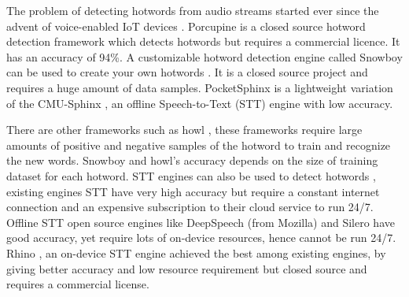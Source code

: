 \documentclass[10pt,twocolumn]{article}
\begin{document}
\label{Sec:Related_Works}
The problem of detecting hotwords from audio streams started ever since the advent of voice-enabled IoT devices \cite{Ooi_2019,Michaely_2017, inproceedings2_Reis_2018,inproceedings3_Todisco_2019,Tom_2018,He_Kaiming_2016,He_2016,Lin_2018,becker2019interpreting,Uitdenbogerd_2004,Tang_2018}. Porcupine \cite{picovoice_alireza} is a closed source hotword detection framework which detects hotwords but requires a commercial licence. It has an accuracy of 94\%. A customizable hotword detection engine called Snowboy can be used to create your own hotwords \cite{Yang_Jee_Leblanc_Weaver_Armand_2020}. It is a closed source project and requires a huge amount of data samples. PocketSphinx \cite{kalith_2012} is a lightweight variation of the CMU-Sphinx \cite{kalith_2012}, an offline Speech-to-Text (STT) engine with low accuracy. 

There are other frameworks such as howl \cite{tang-etal-2020-howl}, these frameworks require large amounts of positive and negative samples of the hotword to train and recognize the new words. Snowboy \cite{chen_yao} and howl’s \cite{tang-etal-2020-howl} accuracy depends on the size of training dataset for each hotword. STT engines can also be used to detect hotwords \cite{amodei2015deep}, existing engines STT \cite{Kubota_patent_2014} have very high accuracy but require a constant internet connection and an expensive subscription to their cloud service to run 24/7. Offline STT open source engines like DeepSpeech (from Mozilla) \cite{amodei2015deep} and Silero \cite{Silero_Models} have good accuracy, yet require lots of on-device resources, hence cannot be run 24/7. Rhino \cite{kenarsari_2018}, an on-device STT engine achieved the best among existing engines, by giving better accuracy and low resource requirement but closed source and requires a commercial license.
\end{document}

